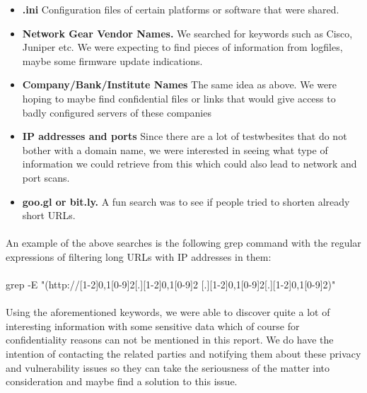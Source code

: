 \documentclass[12pt]{article}
\begin{document}
\begin{itemize}
\item \textbf{.ini} Configuration files of certain platforms or software that were shared.

\item \textbf{Network Gear Vendor Names.} We searched for keywords such as Cisco, Juniper etc. We were expecting to find pieces of information from logfiles, maybe some firmware update indications.

\item \textbf{Company/Bank/Institute Names} The same idea as above. We were hoping to maybe find confidential files or links that would give access to badly configured servers of these companies

\item \textbf{IP addresses and ports} Since there are a lot of testwbesites that do not bother with a domain name, we were interested in seeing what type of information we could retrieve from this which could also lead to network and port scans.

\item \textbf{goo.gl or bit.ly.} A fun search was to see if people tried to shorten already short URLs.

\end{itemize}

\paragraph{}
An example of the above searches is the following grep command with the regular expressions of filtering long URLs with IP addresses in them:

\paragraph{}
grep -E "(http://[1-2]{0,1}[0-9]{2}[.][1-2]{0,1}[0-9]{2}
[.][1-2]{0,1}[0-9]{2}[.][1-2]{0,1}[0-9]{2})"

\paragraph{}
Using the aforementioned keywords, we were able to discover quite a lot of interesting information with some sensitive data which of course for confidentiality reasons can not be mentioned in this report. We do have the intention of contacting the related parties and notifying them about these privacy and vulnerability issues so they can take the seriousness of the matter into consideration and maybe find a solution to this issue.
\end{document}
